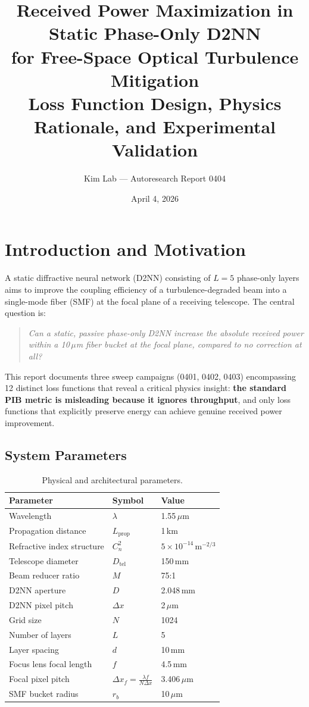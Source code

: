 \documentclass[11pt,a4paper]{article}
\title{\textbf{Received Power Maximization in Static Phase-Only D2NN\\for Free-Space Optical Turbulence Mitigation}\\[0.5em]
\large Loss Function Design, Physics Rationale, and Experimental Validation}
\author{Kim Lab --- Autoresearch Report 0404}
\date{April 4, 2026}
\begin{document}
\maketitle
\tableofcontents
\newpage

\section{Introduction and Motivation}

A static diffractive neural network (D2NN) consisting of $L=5$ phase-only layers aims to improve the coupling efficiency of a turbulence-degraded beam into a single-mode fiber (SMF) at the focal plane of a receiving telescope. The central question is:

\begin{quote}
\textit{Can a static, passive phase-only D2NN increase the absolute received power within a 10\,$\mu$m fiber bucket at the focal plane, compared to no correction at all?}
\end{quote}

This report documents three sweep campaigns (0401, 0402, 0403) encompassing 12 distinct loss functions that reveal a critical physics insight: \textbf{the standard PIB metric is misleading because it ignores throughput}, and only loss functions that explicitly preserve energy can achieve genuine received power improvement.

\subsection{System Parameters}

\begin{table}[H]
\centering
\caption{Physical and architectural parameters.}
\begin{tabular}{lll}
\toprule
Parameter & Symbol & Value \\
\midrule
Wavelength & $\lambda$ & 1.55\,$\mu$m \\
Propagation distance & $L_{\mathrm{prop}}$ & 1\,km \\
Refractive index structure & $C_n^2$ & $5 \times 10^{-14}$\,m$^{-2/3}$ \\
Telescope diameter & $D_{\mathrm{tel}}$ & 150\,mm \\
Beam reducer ratio & $M$ & 75:1 \\
D2NN aperture & $D$ & 2.048\,mm \\
D2NN pixel pitch & $\Delta x$ & 2\,$\mu$m \\
Grid size & $N$ & 1024 \\
Number of layers & $L$ & 5 \\
Layer spacing & $d$ & 10\,mm \\
Focus lens focal length & $f$ & 4.5\,mm \\
Focal pixel pitch & $\Delta x_f = \frac{\lambda f}{N \Delta x}$ & 3.406\,$\mu$m \\
SMF bucket radius & $r_b$ & 10\,$\mu$m \\
\bottomrule
\end{tabular}
\end{table}
\end{document}
